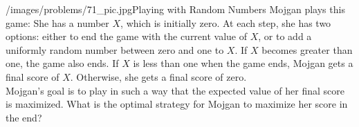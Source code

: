 \begin{problem}{/images/problems/71_pic.jpg}{Playing with Random Numbers} Mojgan plays this game: She has a number $X$, which is initially zero. At each step, she has two options: either to end the game with the current value of $X$, or to add a uniformly random number between zero and one to $X$. If $X$ becomes greater than one, the game also ends.
	If $X$ is less than one when the game ends, Mojgan gets a final score of $X$. Otherwise, she gets a final score of zero.\\[0.2cm]
	
	Mojgan's goal is to play in such a way that the expected value of her final score is maximized. What is the optimal strategy for Mojgan to maximize her score in the end?
\end{problem}

